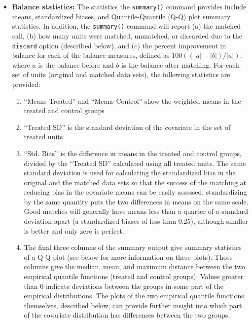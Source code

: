 \begin{itemize}
\item {\bf Balance statistics:} The statistics the \texttt{summary()}
  command provides include means, standardized biases, and
  Quantile-Quantile (Q-Q) plot summary statistics.  In
  addition, the \texttt{summary()} command will report (a) the matched
  call, (b) how many units were matched, unmatched, or discarded due
  to the \texttt{discard} option (described below), and (c) the
  percent improvement in balance for each of the balance measures,
  defined as $100((|a|-|b|)/|a|)$, where $a$ is the balance before and
  $b$ is the balance after matching.  For each set of units (original
  and matched data sets), the following statistics are provided:
\begin{enumerate}
  \item ``Means Treated'' and ``Means Control'' show the weighted
    means in the treated and control groups
  \item ``Treated SD'' is the standard deviation of the covariate in
    the set of treated units
  \item ``Std. Bias'' is the difference in means in the treated and
    control groups, divided by the ``Treated SD'' calculated using all
    treated units.  The same standard deviation is used for
    calculating the standardized bias in the original and the matched
    data sets so that the success of the matching at reducing bias in
    the covariate means can be easily assessed; standardizing by the
    same quantity puts the two differences in means on the same scale.
    Good matches will generally have means less than a quarter of a
    standard deviation apart (a standardized biases of less than
    0.25), although smaller is better and only zero is perfect.
  \item The final three columns of the summary output give summary
    statistics of a Q-Q plot (see below for more information on these
    plots). Those columns give the median, mean, and maximum distance
    between the two empirical quantile functions (treated and control
    groups).  Values greater than 0 indicate deviations between the
    groups in some part of the empirical distributions.  The plots of
    the two empirical quantile functions themselves, described below,
    can provide further insight into which part of the covariate
    distribution has differences between the two groups.
\end{enumerate}


\end{itemize}
